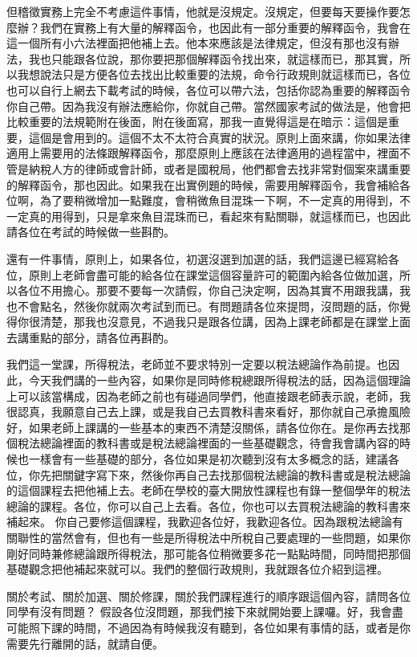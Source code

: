 \documentclass[oneside,sub3section]{ctexbook}
\begin{document}
但稽徵實務上完全不考慮這件事情，他就是沒規定。沒規定，但要每天要操作要怎麼辦？我們在實務上有大量的解釋函令，也因此有一部分重要的解釋函令，我會在這一個所有小六法裡面把他補上去。他本來應該是法律規定，但沒有那也沒有辦法，我也只能跟各位說，那你要把那個解釋函令找出來，就這樣而已，那其實，所以我想說法只是方便各位去找出比較重要的法規，命令行政規則就這樣而已，各位也可以自行上網去下載考試的時候，各位可以帶六法，包括你認為重要的解釋函令你自己帶。因為我沒有辦法應給你，你就自己帶。當然國家考試的做法是，他會把比較重要的法規範附在後面，附在後面寫，那我一直覺得這是在暗示：這個是重要，這個是會用到的。這個不太不太符合真實的狀況。原則上面來講，你如果法律適用上需要用的法條跟解釋函令，那麼原則上應該在法律適用的過程當中，裡面不管是納稅人方的律師或會計師，或者是國稅局，他們都會去找非常對個案來講重要的解釋函令，那也因此。如果我在出實例題的時候，需要用解釋函令，我會補給各位啊，為了要稍微增加一點難度，會稍微魚目混珠一下啊，不一定真的用得到，不一定真的用得到，只是拿來魚目混珠而已，看起來有點關聯，就這樣而已，也因此請各位在考試的時候做一些斟酌。

還有一件事情，原則上，如果各位，初選沒選到加選的話，我們這邊已經寫給各位，原則上老師會盡可能的給各位在課堂這個容量許可的範圍內給各位做加選，所以各位不用擔心。那要不要每一次請假，你自己決定啊，因為其實不用跟我講，我也不會點名，然後你就兩次考試到而已。有問題請各位來提問，沒問題的話，你覺得你很清楚，那我也沒意見，不過我只是跟各位講，因為上課老師都是在課堂上面去講重點的部分，請各位再斟酌。

我們這一堂課，所得稅法，老師並不要求特別一定要以稅法總論作為前提。也因此，今天我們講的一些內容，如果你是同時修稅總跟所得稅法的話，因為這個理論上可以該當構成，因為老師之前也有碰過同學們，他直接跟老師表示說，老師，我很認真，我願意自己去上課，或是我自己去買教科書來看好，那你就自己承擔風險好，如果老師上課講的一些基本的東西不清楚沒關係，請各位你在。是你再去找那個稅法總論裡面的教科書或是稅法總論裡面的一些基礎觀念，待會我會講內容的時候也一樣會有一些基礎的部分，各位如果是初次聽到沒有太多概念的話，建議各位，你先把關鍵字寫下來，然後你再自己去找那個稅法總論的教科書或是稅法總論的這個課程去把他補上去。老師在學校的臺大開放性課程也有錄一整個學年的稅法總論的課程。各位，你可以自己上去看。各位，你也可以去買稅法總論的教科書來補起來。
你自己要修這個課程，我歡迎各位好，我歡迎各位。因為跟稅法總論有關聯性的當然會有，但也有一些是所得稅法中所稅自己要處理的一些問題，如果你剛好同時兼修總論跟所得稅法，那可能各位稍微要多花一點點時間，同時間把那個基礎觀念把他補起來就可以。我們的整個行政規則，我就跟各位介紹到這裡。

關於考試、關於加選、關於修課，關於我們課程進行的順序跟這個內容，請問各位同學有沒有問題？ 假設各位沒問題，那我們接下來就開始要上課囉。好，我會盡可能照下課的時間，不過因為有時候我沒有聽到，各位如果有事情的話，或者是你需要先行離開的話，就請自便。
\end{document}
